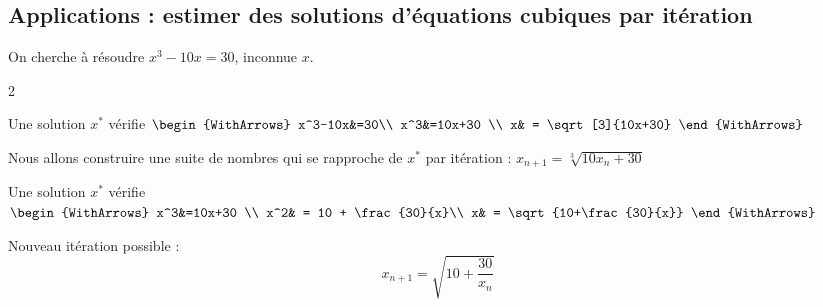 \documentclass[main.tex]{subfiles}
\begin{document}
\subsection{Applications : estimer des solutions d'équations cubiques par itération}
\begin{example}On cherche à résoudre $x^3-10x =30$, inconnue $x$.
\end{example}
\begin{spacing}{2}
\noindent
\parbox{0.48\linewidth}{
Une solution $x^*$ vérifie  
$\begin{WithArrows}
	x^3-10x&=30\\
	x^3&=10x+30   	\\
	x& =  \sqrt[3]{10x+30} 
\end{WithArrows}$ 

Nous allons construire une suite de nombres qui se rapproche de $x^*$ par itération :
$ 
x_{n+1}=\sqrt[3]{10x_n+30}
$ 
}
\hfill 
\parbox{0.48\linewidth}{
	Une solution $x^*$ vérifie  
	$\begin{WithArrows} 
		x^3&=10x+30   	\\ 
		x^2& = 10 + \frac{30}{x}\\
		x& = \sqrt{10+\frac{30}{x}}
	\end{WithArrows}$ 
	
Nouveau itération possible :
\setlength{\abovedisplayskip}{3pt}
\setlength{\belowdisplayskip}{3pt}
$$
x_{n+1}=\sqrt{10+\frac{30}{x_n}}
$$
}
\end{spacing} 
\end{document}
